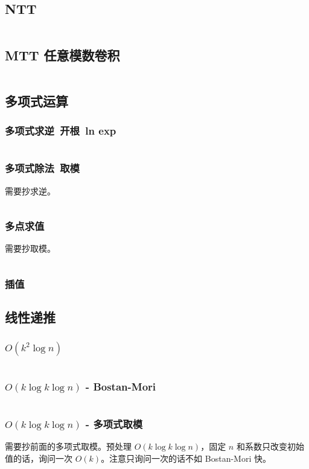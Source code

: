 \documentclass[titlepage, a4paper, 11pt]{article}
\begin{document}
\begin{spacing}{1.15}
				\subsection{NTT}
					\inputminted{cpp}{src/Math/NTT.cpp}
				\subsection{MTT 任意模数卷积}
					\inputminted{cpp}{src/Math/MTT.cpp}
				\subsection{多项式运算}
					\subsubsection{多项式求逆\ 开根\ ln exp}
						\inputminted{cpp}{src/Math/多项式运算.cpp}
					\subsubsection{多项式除法\ 取模}
						需要抄求逆。
						\inputminted{cpp}{src/Math/多项式取模.cpp}
					\subsubsection{多点求值}
						需要抄取模。
						\inputminted{cpp}{src/Math/多点求值.cpp}
					\subsubsection{插值}
						
				\subsection{线性递推}
					\subsubsection*{$O(k^2 \log n)$}
						\inputminted{cpp}{src/Math/线性递推.cpp}
					\subsubsection*{$O(k \log k \log n)$ - Bostan-Mori}
						\inputminted{cpp}{src/Math/快速线性递推-bostan-mori.cpp}
					\subsubsection*{$O(k \log k \log n)$ - 多项式取模}
						需要抄前面的多项式取模。预处理 $O(k \log k \log n)$，固定 $n$ 和系数只改变初始值的话，询问一次 $O(k)$。注意只询问一次的话不如 Bostan-Mori 快。
						\inputminted{cpp}{src/Math/快速线性递推-多项式取模.cpp}

\end{spacing}
\end{document}
